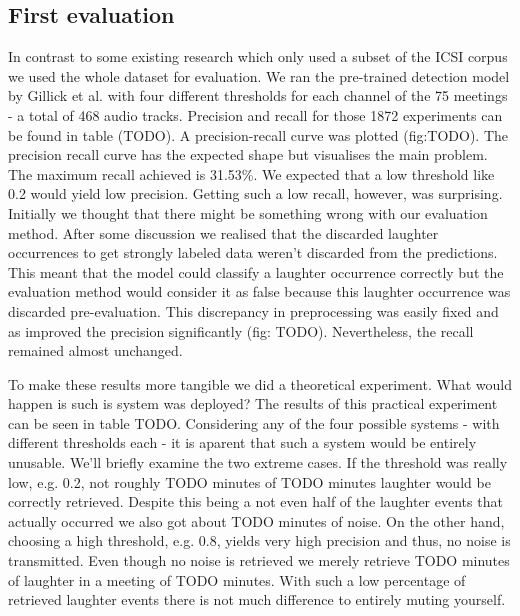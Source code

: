 \documentclass[bsc,frontabs,parskip,deptreport]{infthesis}
\begin{document}
\subsection{First evaluation}
In contrast to some existing research \cite{kennedy2004laughter, knox2006automatic} which only used a subset of the ICSI corpus we used the whole dataset for evaluation. We ran the pre-trained detection model by Gillick et al. with four different thresholds for each channel of the 75 meetings - a total of 468 audio tracks. 
Precision and recall for those 1872 experiments can be found in table (TODO).
A precision-recall curve was plotted (fig:TODO). The precision recall curve has the expected shape but visualises the main problem. The maximum recall achieved is 31.53\%. We expected that a low threshold like 0.2 would yield low precision. Getting such a low recall, however, was surprising. 
Initially we thought that there might be something wrong with our evaluation method. After some discussion we realised that the discarded laughter occurrences to get strongly labeled data weren't discarded from the predictions. This meant that the model could classify a laughter occurrence correctly but the evaluation method would consider it as false because this laughter occurrence was discarded pre-evaluation. This discrepancy in preprocessing was easily fixed and as improved the precision significantly (fig: TODO). Nevertheless, the recall remained almost unchanged. 

To make these results more tangible we did a theoretical experiment. What would happen is such is system was deployed? The results of this practical experiment can be seen in table TODO. 
Considering any of the four possible systems - with different thresholds each - it is aparent that such a system would be entirely unusable. We'll briefly examine the two extreme cases. If the threshold was really low, e.g. 0.2, not roughly TODO minutes of TODO minutes laughter would be correctly retrieved. Despite this being a not even half of the laughter events that actually occurred we also got about TODO minutes of noise.  
On the other hand, choosing a high threshold, e.g. 0.8, yields very high precision and thus, no noise is transmitted. Even though no noise is retrieved we merely retrieve TODO minutes of laughter in a meeting of TODO minutes. With such a low percentage of retrieved laughter events there is not much difference to entirely muting yourself. 
\end{document}
